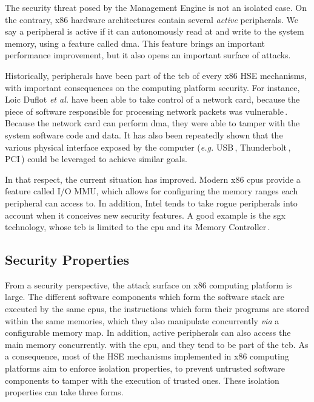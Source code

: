 The security threat posed by the Management Engine is not an isolated case.
%
On the contrary, x86 hardware architectures contain several \emph{active}
peripherals.
%
We say a peripheral is active if it can autonomously read at and write to the
system memory, using a feature called \ac{dma}.
%
This feature brings an important performance improvement, but it also opens an
important surface of attacks.

Historically, peripherals have been part of the \ac{tcb} of every x86 HSE
mechanisms, with important consequences on the computing platform security.
%
For instance, Loic Duflot \emph{et al.} have been able to take control of a
network card, because the piece of software responsible for processing network
packets was vulnerable\,\cite{duflot2010network}.
%
Because the network card can perform \ac{dma}, they were able to tamper with the
system software code and data.
%
It has also been repeatedly shown that the various physical interface exposed by
the computer (\emph{e.g.} USB\,\cite{nohl2014badusb},
Thunderbolt\,\cite{hudson2015thunderstrike}, PCI\,\cite{chifflier2013uefi})
could be leveraged to achieve similar goals.

In that respect, the current situation has improved.
%
Modern x86 \acp{cpu} provide a feature called I/O MMU, which allows for
configuring the memory ranges each peripheral can access to.
%
In addition, Intel tends to take rogue peripherals into account when it
conceives new security features.
%
A good example is the \ac{sgx} technology, whose \ac{tcb} is limited to the
\ac{cpu} and its Memory Controller\,\cite{costan2016sgxexplained}.

\subsection{Security Properties}

From a security perspective, the attack surface on x86 computing platform is
large.
%
The different software components which form the software stack are executed by
the same \acp{cpu}, the instructions which form their programs are stored within
the same memories, which they also manipulate concurrently \emph{via} a
configurable memory map.
%
In addition, active peripherals can also access the main memory concurrently.
with the \ac{cpu}, and they tend to be part of the \ac{tcb}.
%
As a consequence, most of the HSE mechanisms implemented in x86 computing
platforms aim to enforce isolation properties, to prevent untrusted software
components to tamper with the execution of trusted ones.
%
These isolation properties can take three forms.

